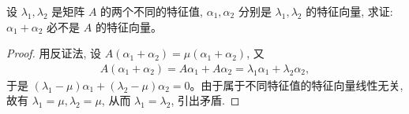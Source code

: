 \documentclass[../../main.tex]{subfiles}%
\begin{document}
\begin{example}
设 $\lambda_1, \lambda_2$ 是矩阵 $A$ 的两个不同的特征值, $\alpha_1, \alpha_2$ 分别是 $\lambda_1, \lambda_2$ 的特征向量, 求证: $\alpha_1 + \alpha_2$ 必不是 $A$ 的特征向量。
\end{example}
\begin{proof}
用反证法, 设 $A(\alpha_1 + \alpha_2) = \mu (\alpha_1 + \alpha_2)$, 又
\begin{align*}
A(\alpha_1 + \alpha_2) = A\alpha_1 + A\alpha_2 
= \lambda_1 \alpha_1 + \lambda_2 \alpha_2,
\end{align*}
于是 $(\lambda_1 - \mu) \alpha_1 + (\lambda_2 - \mu) \alpha_2 = 0$。由于属于不同特征值的特征向量线性无关, 故有 $\lambda_1 = \mu, \lambda_2 = \mu$, 从而 $\lambda_1 = \lambda_2$, 引出矛盾.
\end{proof}
\end{document}
